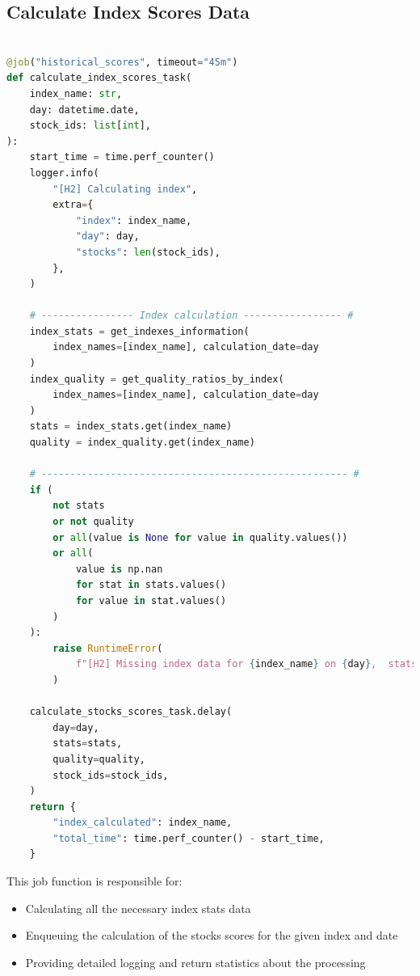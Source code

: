 \documentclass[11pt,english,a4paper,hidelinks]{book}
\begin{document}
\subsection{Calculate Index Scores Data}
\begin{lstlisting}[language=Python, caption=Calculate Index Scores Data, label={lst:calculate_index_scores_task}]

@job("historical_scores", timeout="45m")
def calculate_index_scores_task(
    index_name: str,
    day: datetime.date,
    stock_ids: list[int],
):
    start_time = time.perf_counter()
    logger.info(
        "[H2] Calculating index",
        extra={
            "index": index_name,
            "day": day,
            "stocks": len(stock_ids),
        },
    )

    # ---------------- Index calculation ----------------- #
    index_stats = get_indexes_information(
        index_names=[index_name], calculation_date=day
    )
    index_quality = get_quality_ratios_by_index(
        index_names=[index_name], calculation_date=day
    )
    stats = index_stats.get(index_name)
    quality = index_quality.get(index_name)

    # ----------------------------------------------------- #
    if (
        not stats
        or not quality
        or all(value is None for value in quality.values())
        or all(
            value is np.nan
            for stat in stats.values()
            for value in stat.values()
        )
    ):
        raise RuntimeError(
            f"[H2] Missing index data for {index_name} on {day},  stats: {stats}, quality: {quality}"
        )

    calculate_stocks_scores_task.delay(
        day=day,
        stats=stats,
        quality=quality,
        stock_ids=stock_ids,
    )
    return {
        "index_calculated": index_name,
        "total_time": time.perf_counter() - start_time,
    }
\end{lstlisting}

\noindent This job function is responsible for:
\begin{itemize}
    \item Calculating all the necessary index stats data
    \item Enqueuing the calculation of the stocks scores for the given index and date
    \item Providing detailed logging and return statistics about the processing
\end{itemize}
\end{document}

